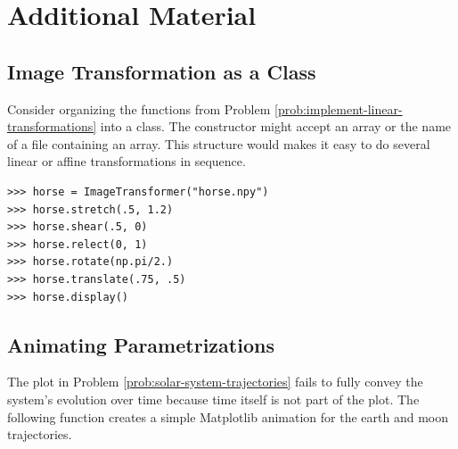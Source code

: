 \newpage

\section*{Additional Material} %

\subsection*{Image Transformation as a Class} %

Consider organizing the functions from Problem \ref{prob:implement-linear-transformations} into a class.
The constructor might accept an array or the name of a file containing an array.
This structure would makes it easy to do several linear or affine transformations in sequence.

\begin{lstlisting}
>>> horse = ImageTransformer("horse.npy")
>>> horse.stretch(.5, 1.2)
>>> horse.shear(.5, 0)
>>> horse.relect(0, 1)
>>> horse.rotate(np.pi/2.)
>>> horse.translate(.75, .5)
>>> horse.display()
\end{lstlisting}

\subsection*{Animating Parametrizations} %

The plot in Problem \ref{prob:solar-system-trajectories} fails to fully convey the system's evolution over time because time itself is not part of the plot.
The following function creates a simple Matplotlib animation for the earth and moon trajectories.

